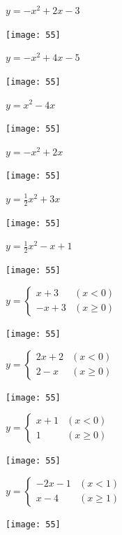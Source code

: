 \documentclass[a4paper]{oblivoir}
\begin{document}
\clearpage
\begin{minipage}{0.45\textwidth}\centering
\(y=-x^2+2x-3\)
\par\bigskip\texttt{[image: 55]}
\end{minipage}
\begin{minipage}{0.45\textwidth}\centering
\(y=-x^2+4x-5\)
\par\bigskip\texttt{[image: 55]}
\end{minipage}\bigskip\bigskip\par
\begin{minipage}{0.45\textwidth}\centering
\(y=x^2-4x\)
\par\bigskip\texttt{[image: 55]}
\end{minipage}
\begin{minipage}{0.45\textwidth}\centering
\(y=-x^2+2x\)
\par\bigskip\texttt{[image: 55]}
\end{minipage}\bigskip\bigskip\par
\begin{minipage}{0.45\textwidth}\centering
\(y=\frac12x^2+3x\)
\par\bigskip\texttt{[image: 55]}
\end{minipage}
\begin{minipage}{0.45\textwidth}\centering
\(y=\frac12x^2-x+1\)
\par\bigskip\texttt{[image: 55]}
\end{minipage}\bigskip\bigskip\par

\clearpage
\begin{minipage}{0.45\textwidth}\centering
\(y=\begin{cases}x+3&(x<0)\\-x+3&(x\ge0)\end{cases}\)
\par\bigskip\texttt{[image: 55]}
\end{minipage}
\begin{minipage}{0.45\textwidth}\centering
\(y=\begin{cases}2x+2&(x<0)\\2-x&(x\ge0)\end{cases}\)
\par\bigskip\texttt{[image: 55]}
\end{minipage}\bigskip\bigskip\par
\begin{minipage}{0.45\textwidth}\centering
\(y=\begin{cases}x+1&(x<0)\\1&(x\ge0)\end{cases}\)
\par\bigskip\texttt{[image: 55]}
\end{minipage}
\begin{minipage}{0.45\textwidth}\centering
\(y=\begin{cases}-2x-1&(x<1)\\x-4&(x\ge1)\end{cases}\)
\par\bigskip\texttt{[image: 55]}
\end{minipage}\bigskip\bigskip\par
\end{document}
